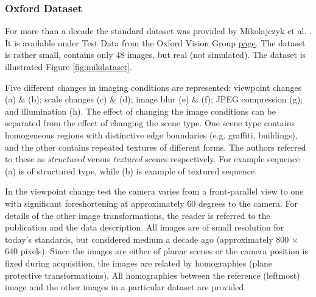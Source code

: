 \subsubsection{Oxford Dataset}

For more than a decade the standard dataset was provided by Mikolajczyk et al. \cite{Mikolajczyk:2005}. It is available under Test Data from the Oxford Vision Group \href{http://www.robots.ox.ac.uk/~vgg/research/affine/index.html}{\underline{page}}. The dataset is rather small, contains only $48$ images, but real (not simulated). The dataset is illustrated Figure \ref{fig:mikdataset}. 

 Five different changes in imaging conditions are represented: viewpoint changes (a) \& (b); scale changes (c) \& (d); image blur (e) \& (f); JPEG compression (g); and illumination (h). The effect of changing the image conditions can be separated from
the effect of changing the scene type. One scene type contains homogeneous regions with distinctive edge boundaries (e.g. graffiti, buildings), and the other contains
repeated textures of different forms. The authors referred to these as {\em structured} versus {\em textured} scenes respectively. For example sequence (a) is of structured type, while (b) is example of textured sequence.

In the viewpoint change test the camera varies from a front-parallel view to one with significant foreshortening
at approximately 60 degrees to the camera. For details of the other image transformations, the reader is referred to the publication \cite{Mikolajczyk:2005} and the data description.   All images are of small resolution for today's standards, but considered medium a decade ago (approximately 800 $\times$ 640 pixels).
Since the images are either of planar scenes or the camera position is fixed during acquisition, the images are related by homographies (plane
protective transformations). All homographies between the reference (leftmost) image and the other images in a particular dataset are provided.

